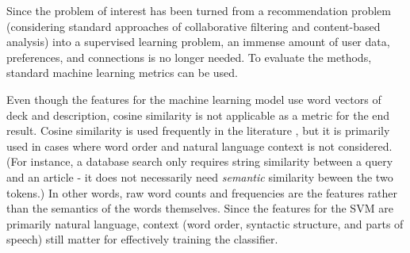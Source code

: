 \documentclass[10pt,twocolumn]{article}
\begin{document}

Since the problem of interest has been turned from a recommendation problem (considering standard approaches of collaborative filtering and content-based analysis) into a supervised learning problem, an immense amount of user data, preferences, and connections is no longer needed. To evaluate the methods, standard machine learning metrics can be used.

Even though the features for the machine learning model use word vectors of deck and description, cosine similarity is not applicable as a metric for the end result. Cosine similarity is used frequently in the literature \cite{Ferdaous, Ryan_47, STata}, but it is primarily used in cases where word order and natural language context is not considered. (For instance, a database search only requires string similarity between a query and an article - it does not necessarily need \textit{semantic} similarity beween the two tokens.) In other words, raw word counts and frequencies are the features rather than the semantics of the words themselves. Since the features for the SVM are primarily natural language, context (word order, syntactic structure, and parts of speech) still matter for effectively training the classifier. 
\end{document}

